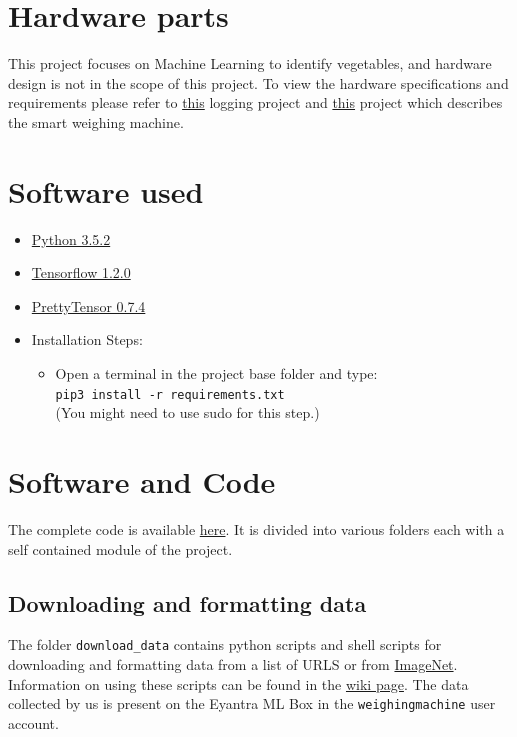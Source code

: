 \documentclass[a4paper,12pt,oneside]{book}
\begin{document}
\section{Hardware parts}
This project focuses on Machine Learning to identify vegetables, and hardware design is not in the scope of this project. To view the hardware specifications and requirements please refer to \href{https://github.com/eYSIP-2017/eYSIP-2017_Development_of_Web_Interface_for_GH_Farm_Produce}{this} logging project and \href{https://github.com/Ankurrpanwar26/eYSIP-2016-Farm-Produce-Logging-and-Monitoring}{this} project which describes the smart weighing machine.


\newpage
\section{Software used}
\begin{itemize}
  \item \href{https://www.python.org/downloads/release/python-352/}{Python 3.5.2}
  \item \href{https://pypi.python.org/pypi/tensorflow/1.2.0}{Tensorflow 1.2.0}
  \item \href{https://github.com/google/prettytensor}{PrettyTensor 0.7.4} 
  \item Installation Steps:
  \begin{itemize}
  	\item Open a terminal in the project base folder and type: \\
  	\texttt{pip3 install -r requirements.txt} \\
  	(You might need to use sudo for this step.)
  \end{itemize}
\end{itemize}


\section{Software and Code}
The complete code is available \href{https://github.com/eYSIP-2017/eYSIP-2017_Vegetable-Identification-Using-Transfer-Learning}{here}. It is divided into various folders each with a self contained module of the project.

\subsection{Downloading and formatting data}
The folder \texttt{download\_data} contains python scripts and shell scripts for downloading and formatting data from a list of URLS or from \href{http://www.image-net.org/}{ImageNet}. Information on using these scripts can be found in the \href{https://github.com/eYSIP-2017/eYSIP-2017_Vegetable-Identification-Using-Transfer-Learning/wiki/Downloading-and-formatting-data.}{wiki page}. The data collected by us is present on the Eyantra ML Box in the \texttt{weighingmachine} user account.
\end{document}
